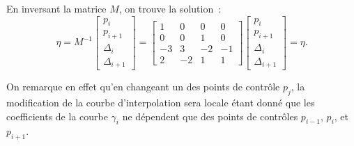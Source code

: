 \documentclass[10pt,journal,compsoc]{IEEEtran}
\begin{document}
	En inversant la matrice $M$, on trouve la solution~:
	\begin{equation}
	  \eta = M^{-1}\begin{bmatrix}p_i \\ p_{i+1} \\ \Delta_i \\ \Delta_{i+1} \end{bmatrix}
	  =
	  \begin{bmatrix}
	    1 & 0 & 0 & 0 \\
		0 & 0 & 1 & 0 \\
		-3 & 3 & -2 & -1 \\
		2 & -2 & 1 & 1
	  \end{bmatrix}
	  \begin{bmatrix}
	    p_i \\ p_{i+1} \\ \Delta_i \\ \Delta_{i+1}
	  \end{bmatrix}
	  = \eta.
	\end{equation}

	On remarque en effet qu'en changeant un des points de contrôle $p_j$, la modification de la courbe d'interpolation sera locale étant donné
	que les coefficients de la courbe $\gamma_i$ ne dépendent que des points de contrôles $p_{i-1}$, $ p_i$, et $p_{i+1}$.
\end{document}

